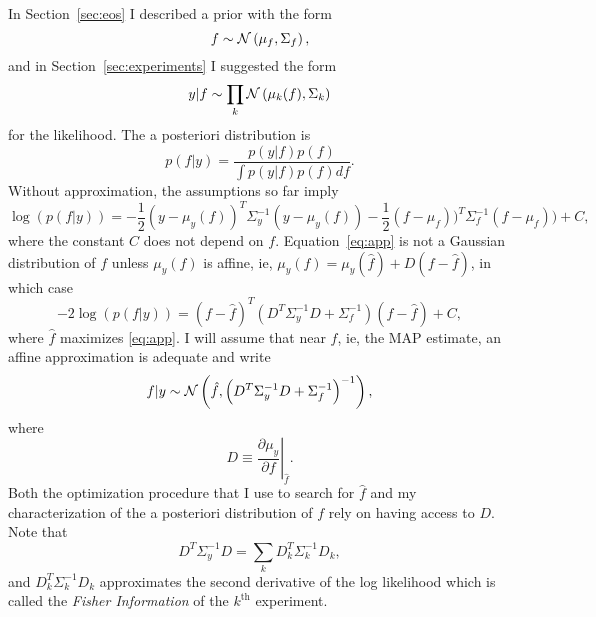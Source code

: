 \documentclass[11pt]{article}
\newcommand{\normal}[2]{{\cal N}\left( #1,#2 \right)}
\newcommand{\normalexp}[3]{ -\frac{1}{2}
      (#1 - #2)^T #3^{-1} (#1 - #2) }
\newcommand{\eos}{f}
\newcommand{\data}{y}
\begin{document}
In Section~\ref{sec:eos} I described a prior with the form
\begin{equation*}
  \eos \sim \normal{\mu_\eos}{\Sigma_\eos},
\end{equation*}
and in Section~\ref{sec:experiments} I suggested the form
\begin{equation*}
  \data | \eos \sim \prod_k \normal{\mu_k(f)}{\Sigma_k}
\end{equation*}
for the likelihood.  The a posteriori distribution is
\begin{equation*}
  p(\eos|\data) = \frac{p(\data|\eos) p(\eos)}{\int p(\data|\eos)
    p(\eos) d \eos}.
\end{equation*}
Without approximation, the assumptions so far imply
\begin{equation}
  \label{eq:app}
  \log(p(\eos|\data)) = \normalexp{\data}{\mu_\data(\eos)}{\Sigma_\data}
\normalexp{\eos}{\mu_\eos)}{\Sigma_\eos} + C,
\end{equation}
where the constant $C$ does not depend on $f$.
Equation~\eqref{eq:app} is not a Gaussian distribution of $\eos$
unless $\mu_\data(\eos)$ is affine, ie,
$\mu_\data(\eos) = \mu_\data(\hat \eos) + D(\eos - \hat \eos)$, in
which case
\begin{equation*}
  -2\log(p(\eos|\data)) = \left(\eos - \hat \eos \right)^T
  \left( D^T \Sigma_\data^{-1} D + \Sigma_\eos^{-1} \right)
  \left(\eos - \hat \eos \right) + C,
\end{equation*}
where $\hat \eos$ maximizes \eqref{eq:app}.  I will assume that near
$\hat \eos$, ie, the MAP estimate, an affine approximation is adequate
and write
\begin{equation}
  \label{eq:normal_app}
  \eos|\data \sim \normal{\hat \eos}{\left( D^T \Sigma_\data^{-1} D + \Sigma_\eos^{-1} \right)^{-1}},
\end{equation}
where
\begin{equation*}
  D \equiv \left. \frac{\partial\mu_\data}{\partial \eos}
  \right|_{\hat \eos} .
\end{equation*}
Both the optimization procedure that I use to search for $\hat \eos$
and my characterization of the a posteriori distribution of $\eos$
rely on having access to $D$.  Note that
\begin{equation}
  \label{eq:Fisher_I}
   D^T \Sigma_\data^{-1} D = \sum_k D_k^T \Sigma_k^{-1} D_k,
\end{equation}
and $D_k^T \Sigma_k^{-1} D_k$ approximates the second derivative of
the log likelihood which is called the \emph{Fisher Information} of
the $k^{\text{th}}$ experiment.
\end{document}
